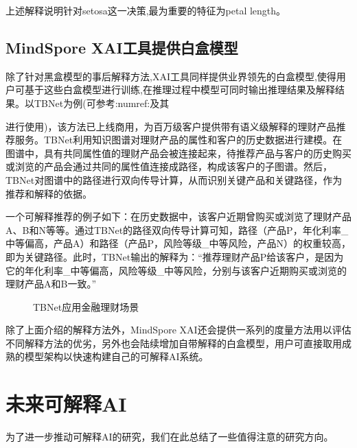 \documentclass[letterpaper,10pt,english]{sphinxmanual}
\let\sphinxpxdimen\pdfpxdimen\else\newdimen\sphinxpxdimen
\begin{document}
\sphinxAtStartPar
上述解释说明针对setosa这一决策,最为重要的特征为petal length。


\subsection{MindSpore XAI工具提供白盒模型}
\label{\detokenize{chapter_explainable_AI/explainable_ai:id20}}
\sphinxAtStartPar
除了针对黑盒模型的事后解释方法,XAI工具同样提供业界领先的白盒模型,使得用户可基于这些白盒模型进行训练,在推理过程中模型可同时输出推理结果及解释结果。以TB\sphinxhyphen{}Net为例(可参考:numref:及其%
\begin{footnote}[87]\sphinxAtStartFootnote
{}
%
\end{footnote}进行使用)，该方法已上线商用，为百万级客户提供带有语义级解释的理财产品推荐服务。TB\sphinxhyphen{}Net利用知识图谱对理财产品的属性和客户的历史数据进行建模。在图谱中，具有共同属性值的理财产品会被连接起来，待推荐产品与客户的历史购买或浏览的产品会通过共同的属性值连接成路径，构成该客户的子图谱。然后，TB\sphinxhyphen{}Net对图谱中的路径进行双向传导计算，从而识别关键产品和关键路径，作为推荐和解释的依据。

\sphinxAtStartPar
一个可解释推荐的例子如下：在历史数据中，该客户近期曾购买或浏览了理财产品A、B和N等等。通过TB\sphinxhyphen{}Net的路径双向传导计算可知，路径（产品P，年化利率\_中等偏高，产品A）和路径（产品P，风险等级\_中等风险，产品N）的权重较高，即为关键路径。此时，TB\sphinxhyphen{}Net输出的解释为：“推荐理财产品P给该客户，是因为它的年化利率\_中等偏高，风险等级\_中等风险，分别与该客户近期购买或浏览的理财产品A和B一致。”

\begin{figure}[H]
\centering
\capstart

\noindent\sphinxincludegraphics[width=800\sphinxpxdimen]{{tbnet_finance}.png}
\caption{TBNet应用金融理财场景}\label{\detokenize{chapter_explainable_AI/explainable_ai:id34}}\label{\detokenize{chapter_explainable_AI/explainable_ai:tbnet-finance}}\end{figure}

\sphinxAtStartPar
除了上面介绍的解释方法外，MindSpore
XAI还会提供一系列的度量方法用以评估不同解释方法的优劣，另外也会陆续增加自带解释的白盒模型，用户可直接取用成熟的模型架构以快速构建自己的可解释AI系统。


\section{未来可解释AI}
\label{\detokenize{chapter_explainable_AI/explainable_ai:id21}}
\sphinxAtStartPar
为了进一步推动可解释AI的研究，我们在此总结了一些值得注意的研究方向。
\end{document}
